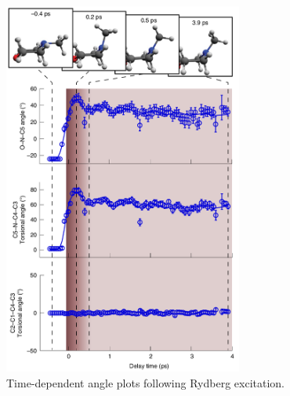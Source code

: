 \documentclass{beamer}
\begin{document}
\begin{frame}
\begin{columns}
\begin{column}{.6\textwidth}
\begin{figure}[H]
				\includegraphics[width=0.7\textwidth]{stankus_angle_plots.png}
				\caption{Time-dependent angle plots
					following Rydberg excitation.}
				\label{fig:nmm-geom}
			\end{figure}
		\end{column}%
		
	\end{columns}
\end{frame}
\end{document}
